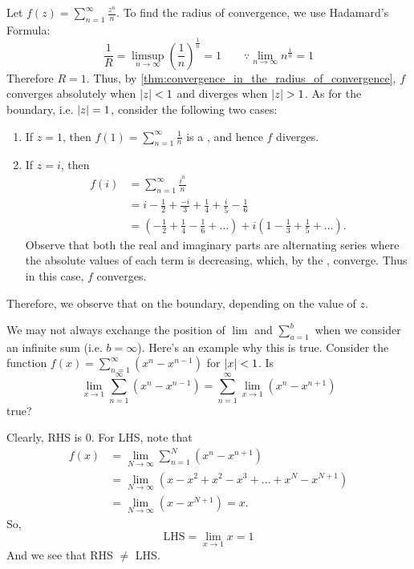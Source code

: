 \documentclass[notoc,notitlepage]{tufte-book}
\begin{document}
\begin{eg}
	Let $f(z) = \sum_{n=1}^{\infty} \frac{z^n}{n}$. To find the radius of convergence, we use Hadamard's Formula:
	\begin{equation*}
		\frac{1}{R} = \limsup_{n \to \infty} \left(\frac{1}{n} \right)^\frac{1}{n} = 1 \qquad \because \lim_{n \to \infty} n^\frac{1}{n} = 1
	\end{equation*}
	Therefore $R = 1$. Thus, by \cref{thm:convergence_in_the_radius_of_convergence}, $f$ converges absolutely when $\left|z\right| < 1$ and diverges when $\left|z\right| > 1$. As for the boundary, i.e. $\left|z\right| = 1$, consider the following two cases:
	\begin{enumerate}
		\item If $z = 1$, then $f(1) = \sum_{n=1}^{\infty} \frac{1}{n}$ is a , and hence $f$ diverges.
		\item If $z = i$, then
		\begin{align*}
			f(i) &= \sum_{n=1}^{\infty} \frac{i^n}{n} \\
				 &= i - \frac{1}{2} + \frac{-i}{3} + \frac{1}{4} + \frac{i}{5} - \frac{1}{6} \\
				 &= \left(-\frac{1}{2} + \frac{1}{4} - \frac{1}{6} + \hdots	\right) + i \left(1 - \frac{1}{3} + \frac{1}{5} + \hdots \right).
		\end{align*}
		Observe that both the real and imaginary parts are alternating series where the absolute values of each term is decreasing, which, by the , converge. Thus in this case, $f$ converges.
	\end{enumerate}
	Therefore, we observe that  on the boundary, depending on the value of $z$.
\end{eg}

\begin{note}
	We may not always exchange the position of $\lim$ and $\sum_{a=1}^{b}$ when we consider an infinite sum (i.e. $b = \infty$). Here's an example why this is true. Consider the function $f(x) = \sum_{n=1}^{\infty} (x^n - x^{n - 1})$ for $\left|x\right| < 1$. Is
	\begin{equation*}
		\lim_{x \to 1} \sum_{n=1}^{\infty} (x^n - x^{n - 1}) = \sum_{n=1}^{\infty} \lim_{x \to 1} (x^n - x^{n + 1})
	\end{equation*}
	true?

	Clearly, RHS is 0. For LHS, note that
	\begin{align*}
		f(x) &= \lim_{N \to \infty} \sum_{n=1}^{N} (x^n - x^{n + 1}) \\
			&= \lim_{N \to \infty} (x - x^2 + x^2 - x^3 + \hdots + x^N - x^{N + 1}) \\
			&= \lim_{N \to \infty} (x - x^{N + 1}) = x.
	\end{align*}
	So,
	\begin{equation*}
		\text{LHS} = \lim_{x \to 1} x = 1
	\end{equation*}
	And we see that RHS $\neq$ LHS.
\end{note}
\end{document}
